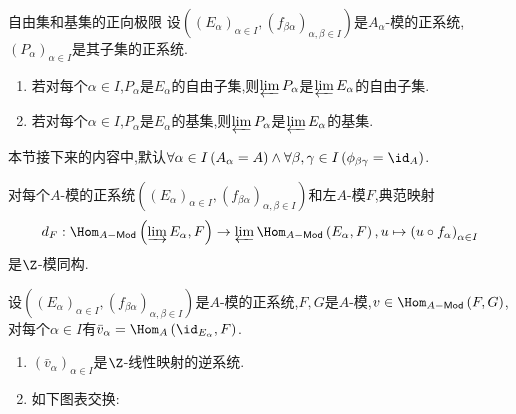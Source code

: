 \begin{corollary}{自由集和基集的正向极限}{}
	设$\left(\left(E_{\alpha}\right)_{\alpha\in I},\left(f_{\beta\alpha}\right)_{\alpha,\beta\in I}\right)$是$A_{\alpha}$-模的正系统,$\left(P_{\alpha}\right)_{\alpha\in I}$是其子集的正系统.
	\begin{enumerate}
		\item 若对每个$\alpha\in I$,$P_{\alpha}$是$E_{\alpha}$的自由子集,则$\varprojlim P_{\alpha}$是$\varprojlim E_{\alpha}$的自由子集.
		\item 若对每个$\alpha\in I$,$P_{\alpha}$是$E_{\alpha}$的基集,则$\varprojlim P_{\alpha}$是$\varprojlim E_{\alpha}$的基集.
	\end{enumerate}
\end{corollary}

本节接下来的内容中,默认$\forall\alpha\in I\left(A_{\alpha}=A\right)\wedge\forall\beta,\gamma\in I\left(\phi_{\beta\gamma}=\id_{A}\right)$.

\begin{proposition}{}{}
	对每个$A$-模的正系统$\left(\left(E_{\alpha}\right)_{\alpha\in I},\left(f_{\beta\alpha}\right)_{\alpha,\beta\in I}\right)$和左$A$-模$F$,典范映射
	\begin{align*}
		d_{F}:\Hom_{A-\mathsf{Mod}}\left(\varinjlim E_{\alpha},F\right)\to\varprojlim\Hom_{A-\mathsf{Mod}}\left(E_{\alpha},F\right),u\mapsto\left(u\circ f_{\alpha}\right)_{\alpha\in I}
	\end{align*}
	是$\Z$-模同构.
\end{proposition}

\begin{corollary}{}{}
	设$\left(\left(E_{\alpha}\right)_{\alpha\in I},\left(f_{\beta\alpha}\right)_{\alpha,\beta\in I}\right)$是$A$-模的正系统,$F,G$是$A$-模,$v\in\Hom_{A-\mathsf{Mod}}\left(F,G\right)$,对每个$\alpha\in I$有$\bar{v}_{\alpha}=\Hom_{A}\left(\id_{E_{\alpha}},F\right)$.
	\begin{enumerate}
		\item $\left(\bar{v}_{\alpha}\right)_{\alpha\in I}$是$\Z$-线性映射的逆系统.
		\item 如下图表交换:
		\begin{center}
		\end{center}
	\end{enumerate}
\end{corollary}


